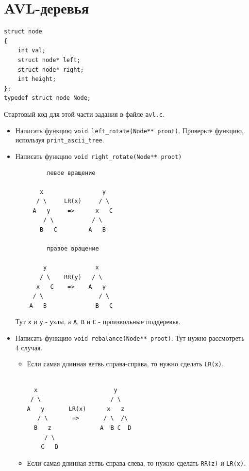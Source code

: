 \documentclass{article}
\begin{document}
\section*{AVL-деревья}
\begin{lstlisting}
struct node
{
	int val;
	struct node* left;
	struct node* right;
	int height;
};
typedef struct node Node;
\end{lstlisting}
Стартовый код для этой части задания в файле \texttt{avl.c}.
\begin{itemize}
\item Написать функцию \texttt{void left\_rotate(Node** proot)}. Проверьте функцию, используя \texttt{print\_ascii\_tree}.
\item Написать функцию \texttt{void right\_rotate(Node** proot)}
\begin{multicols}{2}
\noindent
\begin{lstlisting}
         левое вращение

       x                 y     
      / \     LR(x)     / \     
     A   y     =>      x   C    
        / \           / \       
       B   C         A   B      

         правое вращение
   
        y              x 
       / \    RR(y)   / \
      x   C    =>    A   y
     / \                / \
    A   B              B   C
\end{lstlisting}
\end{multicols}
Тут \texttt{x} и \texttt{y} - узлы, а \texttt{A}, \texttt{B} и \texttt{С} - произвольные поддеревья.
\item Написать функцию \texttt{void rebalance(Node** proot)}. Тут нужно рассмотреть 4 случая. 
\begin{itemize}
\item Если самая длинная ветвь справа-справа, то нужно сделать \texttt{LR(x)}.
\begin{lstlisting}
       
  x                      y                  
 / \                    / \                  
A   y       LR(x)      x   z                 
   / \       =>       / \  /\                        
  B   z              A  B C  D                          
     / \                                        
    C   D                                         
\end{lstlisting}
\item Если самая длинная ветвь справа-слева, то нужно сделать \texttt{RR(z)} и \texttt{LR(x)}.
\begin{lstlisting}
       

\end{lstlisting}
\end{itemize}
\end{itemize}
\end{document}
